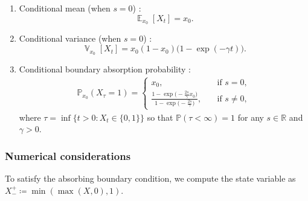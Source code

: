 \documentclass[11pt, letterpaper]{article}
\theoremstyle{definition}
\theoremstyle{remark}
\DeclareMathOperator{\E}{\mathbb{E}}
\DeclareMathOperator{\V}{\mathbb{V}}
\begin{document}
\begin{appendices}
\begin{enumerate}
    \item Conditional mean (when $s = 0$) \cite{ewens2004genetics}: \begin{equation}
        \E_{x_0}[X_t] = x_0.
    \end{equation}
    \item Conditional variance (when $s = 0$) \cite{ewens2004genetics}: \begin{equation}
        \V_{x_0}[X_t] = x_0(1-x_0) \bigl(1-\exp(-\gamma t)\bigr).
    \end{equation}
    \item Conditional boundary absorption probability \cite{ewens2004genetics}:
    \begin{align}
        \mathbb{P}_{x_0}(X_\tau = 1) = \begin{cases}x_0, &\quad \text{if } s = 0,\\
        \frac{1 - \exp\bigl(-\frac{2s}{\gamma} x_0\bigr)}{1 - \exp\bigl(-\frac{2s}{\gamma}\bigr)}, &\quad \text{if } s\neq 0,
        \end{cases}
    \end{align}
    where $\tau = \inf \{t > 0\colon X_t \in \{0,1\}\}$ so that $\mathbb{P}(\tau < \infty) = 1$ for any $s\in\mathbb{R}$ and $\gamma > 0$.
\end{enumerate}

\subsubsection*{Numerical considerations}
To satisfy the absorbing boundary condition, we compute the state variable as $X^+_-\coloneqq \min(\max(X, 0), 1)$.


\end{appendices}
\end{document}
